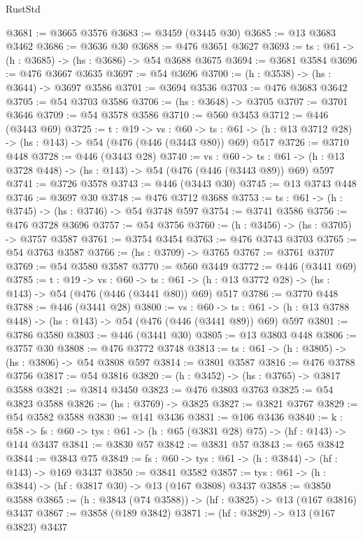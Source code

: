 \begin{lexlean}{RustStd}
\begin{coremodule}
@3681 := @3665 @3576
@3683 := @3459 (@3445 @30)
@3685 := @13 @3683 @3462
@3686 := @3636 @30
@3688 := @476 @3651 @3627
@3693 := {ts : @61} -> (h : @3685) -> (hs : @3686) -> @54 @3688 @3675
@3694 := @3681 @3584
@3696 := @476 @3667 @3635
@3697 := @54 @3696
@3700 := (h : @3538) -> (hs : @3644) -> @3697 @3586
@3701 := @3694 @3536
@3703 := @476 @3683 @3642
@3705 := @54 @3703 @3586
@3706 := (hs : @3648) -> @3705
@3707 := @3701 @3646
@3709 := @54 @3578 @3586
@3710 := @560 @3453
@3712 := @446 (@3443 @69)
@3725 := {t : @19} ->
  {vs : @60} ->
  {ts : @61} -> (h : @13 @3712 @28) -> (hs : @143) -> @54 (@476 (@446 (@3443 @80)) @69) @517
@3726 := @3710 @448
@3728 := @446 (@3443 @28)
@3740 := {vs : @60} ->
  {ts : @61} -> (h : @13 @3728 @448) -> (hs : @143) -> @54 (@476 (@446 (@3443 @89)) @69) @597
@3741 := @3726 @3578
@3743 := @446 (@3443 @30)
@3745 := @13 @3743 @448
@3746 := @3697 @30
@3748 := @476 @3712 @3688
@3753 := {ts : @61} -> (h : @3745) -> (hs : @3746) -> @54 @3748 @597
@3754 := @3741 @3586
@3756 := @476 @3728 @3696
@3757 := @54 @3756
@3760 := (h : @3456) -> (hs : @3705) -> @3757 @3587
@3761 := @3754 @3454
@3763 := @476 @3743 @3703
@3765 := @54 @3763 @3587
@3766 := (hs : @3709) -> @3765
@3767 := @3761 @3707
@3769 := @54 @3580 @3587
@3770 := @560 @3449
@3772 := @446 (@3441 @69)
@3785 := {t : @19} ->
  {vs : @60} ->
  {ts : @61} -> (h : @13 @3772 @28) -> (hs : @143) -> @54 (@476 (@446 (@3441 @80)) @69) @517
@3786 := @3770 @448
@3788 := @446 (@3441 @28)
@3800 := {vs : @60} ->
  {ts : @61} -> (h : @13 @3788 @448) -> (hs : @143) -> @54 (@476 (@446 (@3441 @89)) @69) @597
@3801 := @3786 @3580
@3803 := @446 (@3441 @30)
@3805 := @13 @3803 @448
@3806 := @3757 @30
@3808 := @476 @3772 @3748
@3813 := {ts : @61} -> (h : @3805) -> (hs : @3806) -> @54 @3808 @597
@3814 := @3801 @3587
@3816 := @476 @3788 @3756
@3817 := @54 @3816
@3820 := (h : @3452) -> (hs : @3765) -> @3817 @3588
@3821 := @3814 @3450
@3823 := @476 @3803 @3763
@3825 := @54 @3823 @3588
@3826 := (hs : @3769) -> @3825
@3827 := @3821 @3767
@3829 := @54 @3582 @3588
@3830 := @141 @3436
@3831 := @106 @3436
@3840 := {k : @58} ->
  {fs : @60} -> {tys : @61} -> (h : @65 (@3831 @28) @75) -> (hf : @143) -> @144 @3437
@3841 := @3830 @57
@3842 := @3831 @57
@3843 := @65 @3842
@3844 := @3843 @75
@3849 := {fs : @60} -> {tys : @61} -> (h : @3844) -> (hf : @143) -> @169 @3437
@3850 := @3841 @3582
@3857 := {tys : @61} -> (h : @3844) -> (hf : @3817 @30) -> @13 (@167 @3808) @3437
@3858 := @3850 @3588
@3865 := (h : @3843 (@74 @3588)) -> (hf : @3825) -> @13 (@167 @3816) @3437
@3867 := @3858 (@189 @3842)
@3871 := (hf : @3829) -> @13 (@167 @3823) @3437

\end{coremodule}
\end{lexlean}
